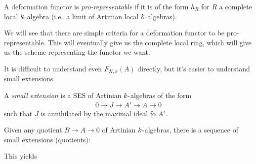 \begin{description}
\tightlist
\item[Definition (Pro-representability)]
A deformation functor is \emph{pro-representable} if it is of the form
\(h_R\) for \(R\) a complete local \(k{\hbox{-}}\)algebra (i.e.~a limit
of Artinian local \(k{\hbox{-}}\)algebras).
\end{description}

We will see that there are simple criteria for a deformation functor to
be pro-representable. This will eventually give us the complete local
ring, which will give us the scheme representing the functor we want.

\begin{description}
\tightlist
\item[Remark]
It is difficult to understand even \(F_{X, x}(A)\) directly, but it's
easier to understand small extensions.
\item[Definition (Small Extensions)]
A \emph{small extension} is a SES of Artinian \(k{\hbox{-}}\)algebras of
the form
\begin{align*}
0 \to J \to A' \to A \to 0
\end{align*}
such that \(J\) is annihilated by the maximal ideal fo \(A'\).
\item[Lemma]
Given any quotient \(B\to A \to 0\) of Artinian \(k{\hbox{-}}\)algebras,
there is a sequence of small extensions (quotients):
\end{description}

\begin{center}


  \end{center}

This yields

